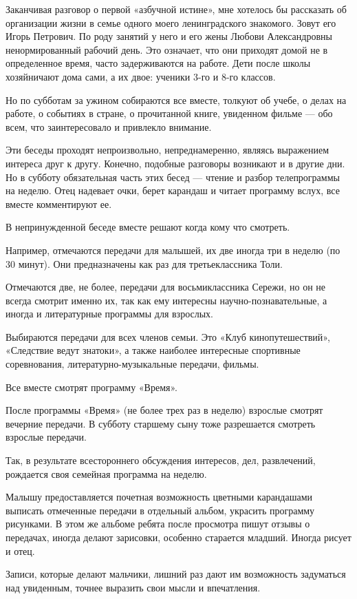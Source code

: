 \documentclass[12pt, a4paper, openany]{book}
\begin{document}
Заканчивая разговор о первой «азбучной истине», мне хотелось бы рассказать об организации жизни в семье одного моего ленинградского знакомого. Зовут его Игорь Петрович. По роду занятий у него и его жены Любови Александровны ненормированный рабочий день. Это означает, что они приходят домой не в определенное время, часто задерживаются на работе. Дети после школы хозяйничают дома сами, а их двое: ученики 3-го и 8-го классов. 

Но по субботам за ужином собираются все вместе, толкуют об учебе, о делах на работе, о событиях в стране, о прочитанной книге, увиденном фильме — обо всем, что заинтересовало и привлекло внимание. 

Эти беседы проходят непроизвольно, непреднамеренно, являясь выражением интереса друг к другу. Конечно, подобные разговоры возникают и в другие дни. Но в субботу обязательная часть этих бесед — чтение и разбор телепрограммы на неделю. Отец надевает очки, берет карандаш и читает программу вслух, все вместе комментируют ее. 

В непринужденной беседе вместе решают когда кому что смотреть. 

Например, отмечаются передачи для малышей, их две иногда три в неделю (по 30 минут). Они предназначены как раз для третьеклассника Толи. 

Отмечаются две, не более, передачи для восьмиклассника Сережи, но он не всегда смотрит именно их, так как ему интересны научно-познавательные, а иногда и литературные программы для взрослых. 

Выбираются передачи для всех членов семьи. Это «Клуб кинопутешествий», «Следствие ведут знатоки», а также наиболее интересные спортивные соревнования, литературно-музыкальные передачи, фильмы. 

Все вместе смотрят программу «Время». 

После программы «Время» (не более трех раз в неделю) взрослые смотрят вечерние передачи. В субботу старшему сыну тоже разрешается смотреть взрослые передачи. 

Так, в результате всестороннего обсуждения интересов, дел, развлечений, рождается своя семейная программа на неделю. 

Малышу предоставляется почетная возможность цветными карандашами выписать отмеченные передачи в отдельный альбом, украсить программу рисунками. В этом же альбоме ребята после просмотра пишут отзывы о передачах, иногда делают зарисовки, особенно старается младший. Иногда рисует и отец. 

Записи, которые делают мальчики, лишний раз дают им возможность задуматься над увиденным, точнее выразить свои мысли и впечатления. 
\end{document}
